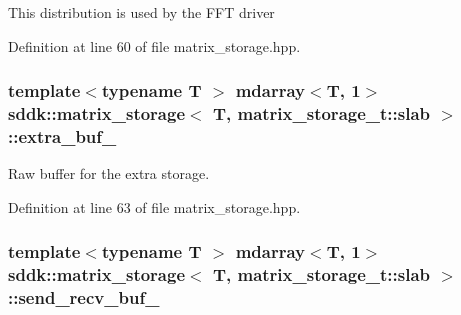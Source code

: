 This distribution is used by the F\+F\+T driver 

Definition at line 60 of file matrix\+\_\+storage.\+hpp.

\hypertarget{classsddk_1_1matrix__storage_3_01_t_00_01matrix__storage__t_1_1slab_01_4_afe3cc19ad8eb86b00642e4a72d355176}{}
\subsubsection[{extra\+\_\+buf\+\_\+}]{\setlength{\rightskip}{0pt plus 5cm}template$<$typename T $>$ {\bf mdarray}$<$T, 1$>$ {\bf sddk\+::matrix\+\_\+storage}$<$ T, matrix\+\_\+storage\+\_\+t\+::slab $>$\+::extra\+\_\+buf\+\_\+\hspace{0.3cm}{\ttfamily [private]}}\label{classsddk_1_1matrix__storage_3_01_t_00_01matrix__storage__t_1_1slab_01_4_afe3cc19ad8eb86b00642e4a72d355176}


Raw buffer for the extra storage. 



Definition at line 63 of file matrix\+\_\+storage.\+hpp.

\hypertarget{classsddk_1_1matrix__storage_3_01_t_00_01matrix__storage__t_1_1slab_01_4_a9437d5b26bc924ac2d002eb490c5fad8}{}
\subsubsection[{send\+\_\+recv\+\_\+buf\+\_\+}]{\setlength{\rightskip}{0pt plus 5cm}template$<$typename T $>$ {\bf mdarray}$<$T, 1$>$ {\bf sddk\+::matrix\+\_\+storage}$<$ T, matrix\+\_\+storage\+\_\+t\+::slab $>$\+::send\+\_\+recv\+\_\+buf\+\_\+\hspace{0.3cm}{\ttfamily [private]}}\label{classsddk_1_1matrix__storage_3_01_t_00_01matrix__storage__t_1_1slab_01_4_a9437d5b26bc924ac2d002eb490c5fad8}


